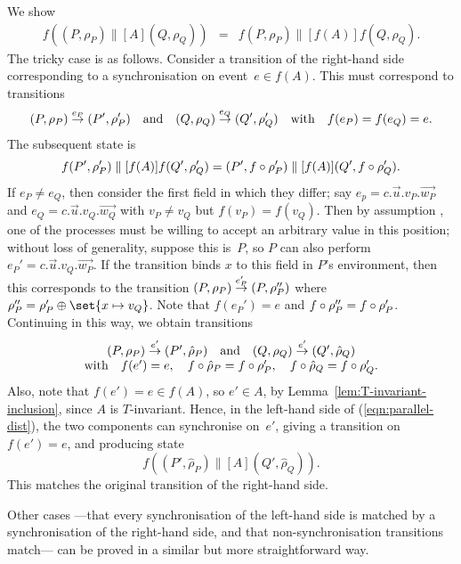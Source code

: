 We show
\begin{eqnarray}
\label{eqn:parallel-dist}
f((P,\rho_P) \parallel[A] (Q,\rho_Q)) & = & 
  f(P,\rho_P) \parallel[f(A)] f(Q,\rho_Q).
\end{eqnarray}
%
The tricky case is as follows.  Consider a transition of the right-hand side
corresponding to a synchronisation on event~$e \in f(A)$.  This must
correspond to transitions 
\[
(P,\rho_P) \stackrel{e_P}{\rightarrow} (P',\rho_P') \quad\mbox{and}\quad
(Q,\rho_Q) \stackrel{e_Q}{\rightarrow} (Q',\rho_Q') \quad
\mbox{with}\quad f(e_P) = f(e_Q) = e.
\]
The subsequent state is 
\[
f(P',\rho_P') \parallel[f(A)] f(Q',\rho_Q') = 
  (P',f\circ\rho_P') \parallel[f(A)] (Q',f\circ\rho_Q').
\]
If $e_P \ne e_Q$, then consider the first field in which they differ; say $e_p
= c.\vec{u}.v_P.\vec{w_P}$ and $e_Q = c.\vec{u}.v_Q.\vec{w_Q}$ with $v_P \ne
v_Q$ but $f(v_P) = f(v_Q)$.
%
Then by assumption , one of the processes must be willing to
accept an arbitrary value in this position; without loss of generality,
suppose this is~$P$, so $P$ can also perform $e_P' = c.\vec{u}.v_Q.\vec{w_P}$.
If the transition binds $x$ to this field in $P$'s environment, then this
corresponds to the transition $(P,\rho_P) \stackrel{e_P'}{\rightarrow} (P,\rho_P'')$ where
$\rho_P'' = \rho_P' \oplus \set{x \mapsto v_Q}$.  Note that $f(e_P') = e$ and
$f\circ\rho_P'' = f \circ \rho_P'$. 
%
Continuing in this way, we obtain transitions
\[
\begin{array}{c}
(P,\rho_P) \stackrel{e'}{\rightarrow} (P',\hat\rho_P) \quad\mbox{and}\quad
(Q,\rho_Q) \stackrel{e'}{\rightarrow} (Q',\hat\rho_Q) \\
\mbox{with}\quad f(e')  = e, \quad 
f \circ \hat\rho_P = f \circ \rho_P', \quad
f \circ \hat\rho_Q = f \circ \rho_Q'.
\end{array}
\]
Also, note that $f(e') = e \in f(A)$, so $e' \in A$, by
Lemma~\ref{lem:T-invariant-inclusion}, since $A$ is $T$-invariant.
%
Hence, in the left-hand side of (\ref{eqn:parallel-dist}), the two
components can synchronise on~$e'$, giving a transition on $f(e') = e$, and
producing state 
\[
f( (P',\hat\rho_P) \parallel[A] (Q',\hat\rho_Q) ) .
\]
This matches the original transition of the right-hand side.

Other cases ---that every synchronisation of the left-hand side is matched by
a synchronisation of the right-hand side, and that non-synchronisation
transitions match--- can be proved in a similar but more straightforward way. 




